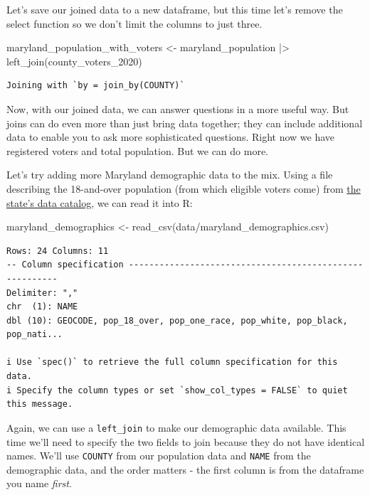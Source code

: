 \documentclass[
  letterpaper,
  DIV=11,
  numbers=noendperiod]{scrreprt}
\newenvironment{Shaded}{\begin{snugshade}}{\end{snugshade}}
\newcommand{\FunctionTok}[1]{\textcolor[rgb]{0.28,0.35,0.67}{#1}}
\newcommand{\NormalTok}[1]{\textcolor[rgb]{0.00,0.23,0.31}{#1}}
\newcommand{\OtherTok}[1]{\textcolor[rgb]{0.00,0.23,0.31}{#1}}
\newcommand{\SpecialCharTok}[1]{\textcolor[rgb]{0.37,0.37,0.37}{#1}}
\newcommand{\StringTok}[1]{\textcolor[rgb]{0.13,0.47,0.30}{#1}}
\begin{document}
Let's save our joined data to a new dataframe, but this time let's
remove the select function so we don't limit the columns to just three.

\begin{Shaded}
\begin{Highlighting}[]
\NormalTok{maryland\_population\_with\_voters }\OtherTok{\textless{}{-}}\NormalTok{ maryland\_population }\SpecialCharTok{|\textgreater{}} \FunctionTok{left\_join}\NormalTok{(county\_voters\_2020)}
\end{Highlighting}
\end{Shaded}

\begin{verbatim}
Joining with `by = join_by(COUNTY)`
\end{verbatim}

Now, with our joined data, we can answer questions in a more useful way.
But joins can do even more than just bring data together; they can
include additional data to enable you to ask more sophisticated
questions. Right now we have registered voters and total population. But
we can do more.

Let's try adding more Maryland demographic data to the mix. Using a file
describing the 18-and-over population (from which eligible voters come)
from
\href{https://planning.maryland.gov/MSDC/Pages/census/Census2020/pL_2020redistricting.aspx}{the
state's data catalog}, we can read it into R:

\begin{Shaded}
\begin{Highlighting}[]
\NormalTok{maryland\_demographics }\OtherTok{\textless{}{-}} \FunctionTok{read\_csv}\NormalTok{(}\StringTok{\textquotesingle{}data/maryland\_demographics.csv\textquotesingle{}}\NormalTok{)}
\end{Highlighting}
\end{Shaded}

\begin{verbatim}
Rows: 24 Columns: 11
-- Column specification --------------------------------------------------------
Delimiter: ","
chr  (1): NAME
dbl (10): GEOCODE, pop_18_over, pop_one_race, pop_white, pop_black, pop_nati...

i Use `spec()` to retrieve the full column specification for this data.
i Specify the column types or set `show_col_types = FALSE` to quiet this message.
\end{verbatim}

Again, we can use a \texttt{left\_join} to make our demographic data
available. This time we'll need to specify the two fields to join
because they do not have identical names. We'll use \texttt{COUNTY} from
our population data and \texttt{NAME} from the demographic data, and the
order matters - the first column is from the dataframe you name
\emph{first}.
\end{document}

